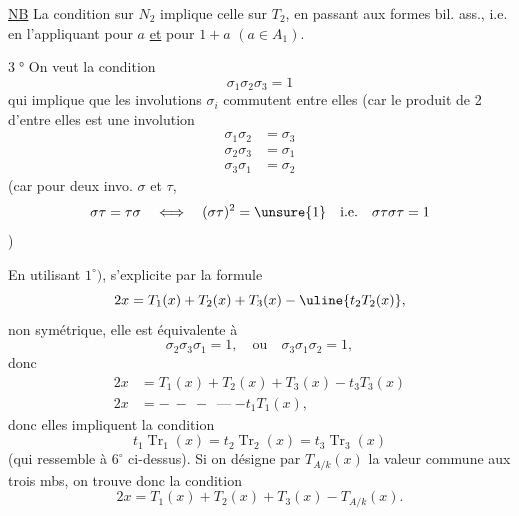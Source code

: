 \uline{NB} La condition sur $N_2$ implique celle sur $T_2$, en passant aux formes bil. ass., i.e. en l'appliquant pour $a$ \uline{et} pour $1+a$ $(a\in A_1)$.

\textcircled{3°} On veut la condition
\[
 \boxed{\sigma_1\sigma_2\sigma_3=1}
\]
qui implique que les involutions $\sigma_i$ commutent entre elles (car le produit de 2 d'entre elles est une involution
\[
 \boxed{\begin{aligned}
 \sigma_1\sigma_2&=\sigma_3\\
 \sigma_2\sigma_3&=\sigma_1\\
 \sigma_3\sigma_1&=\sigma_2
 \end{aligned}}
\]
(car pour deux invo. $\sigma$ et $\tau$,
\[
 \sigma\tau=\tau\sigma\quad\Longleftrightarrow\quad(\sigma\tau)^2=\unsure{1}\quad\text{i.e.}\quad\sigma\tau\sigma\tau=1
\]
)

En utilisant $1^\circ)$,   s'explicite par la formule
\[
 2x=T_1(x)+T_2(x)+T_3(x)-\uline{t_2T_2(x)},
\]
non  symétrique,  elle est équivalente à
\[
 \sigma_2\sigma_3\sigma_1=1,\quad\text{ou}\quad\sigma_3\sigma_1\sigma_2=1,
\]
donc
\[
 \begin{aligned}
 2x&=T_1(x)+T_2(x)+T_3(x)-t_3T_3(x)\\
 2x&=\mathbin{-}\ \mathbin{-}\ \mathbin{-}\ \mathbin{\text{---}}-t_1T_1(x),
 \end{aligned}
\]
donc elles impliquent\unsure{*} la condition
\[
 \boxed{t_1\operatorname{Tr}_1(x)=t_2\operatorname{Tr}_2(x)=t_3\operatorname{Tr}_3(x)}
\]
(qui ressemble à $6^\circ$ ci-dessus). Si on désigne par $T_{A/k}(x)$ la valeur commune aux trois mbs, on trouve donc la condition
\[
 \boxed{2x=T_1(x)+T_2(x)+T_3(x)-T_{A/k}(x).}
\]

